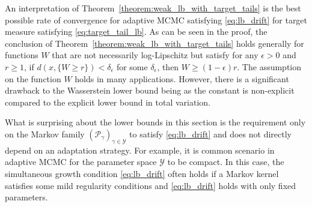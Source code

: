 \documentclass[12pt]{article}
\theoremstyle{plain}
\theoremstyle{remark}
\newcommand{\e}{\epsilon}
\renewcommand{\P}{\mathcal{P}}
\newcommand{\Y}{\mathcal{Y}}
\begin{document}
An interpretation of Theorem~\ref{theorem:weak_lb_with_target_tails} is the best possible rate of convergence for adaptive MCMC satisfying \eqref{eq:lb_drift} for target measure satisfying \eqref{eq:target_tail_lb}.
As can be seen in the proof, the conclusion of Theorem~\ref{theorem:weak_lb_with_target_tails} holds generally for functions $W$ that are not necessarily log-Lipschitz but satisfy for any $\e > 0$ and $r \ge 1$, if $d(x, \{ W \ge r \}) < \delta_\e$ for some $\delta_\e$, then $W \ge (1 - \e) r$.
The assumption on the function $W$ holds in many applications. However, there is a significant drawback to the Wasserstein lower bound being as the constant is non-explicit compared to the explicit lower bound in total variation.

What is surprising about the lower bounds in this section is the requirement only on the Markov family $(\P_\gamma)_{\gamma \in \Y}$ to satisfy \eqref{eq:lb_drift} and does not directly depend on an adaptation strategy.
For example, it is common scenario in adaptive MCMC for the parameter space $\Y$ to be compact.
In this case, the simultaneous growth condition \eqref{eq:lb_drift} often holds if a Markov kernel satisfies some mild regularity conditions and \eqref{eq:lb_drift} holds with only fixed parameters.
\end{document}
